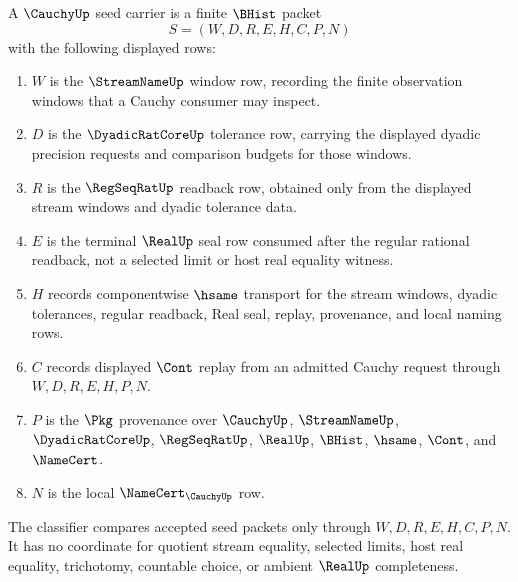 \begin{definition}\label{def:cauchy-seed-carrier}
A $\CauchyUp$ seed carrier is a finite $\BHist$ packet
$$
S=(W,D,R,E,H,C,P,N)
$$
with the following displayed rows:
\begin{enumerate}
\item $W$ is the $\StreamNameUp$ window row, recording the finite observation windows that a Cauchy consumer may inspect.
\item $D$ is the $\DyadicRatCoreUp$ tolerance row, carrying the displayed dyadic precision requests and comparison budgets for those windows.
\item $R$ is the $\RegSeqRatUp$ readback row, obtained only from the displayed stream windows and dyadic tolerance data.
\item $E$ is the terminal $\RealUp$ seal row consumed after the regular rational readback, not a selected limit or host real equality witness.
\item $H$ records componentwise $\hsame$ transport for the stream windows, dyadic tolerances, regular readback, Real seal, replay, provenance, and local naming rows.
\item $C$ records displayed $\Cont$ replay from an admitted Cauchy request through $W,D,R,E,H,P,N$.
\item $P$ is the $\Pkg$ provenance over $\CauchyUp$, $\StreamNameUp$, $\DyadicRatCoreUp$, $\RegSeqRatUp$, $\RealUp$, $\BHist$, $\hsame$, $\Cont$, and $\NameCert$.
\item $N$ is the local $\NameCert_{\CauchyUp}$ row.
\end{enumerate}
The classifier compares accepted seed packets only through $W,D,R,E,H,C,P,N$. It has no coordinate for quotient stream equality, selected limits, host real equality, trichotomy, countable choice, or ambient $\RealUp$ completeness.
\end{definition}


